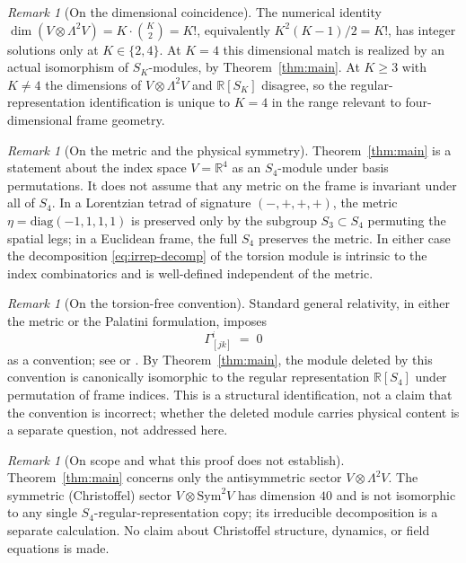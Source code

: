 \documentclass[11pt]{article}
\theoremstyle{plain}
\theoremstyle{remark}
\newtheorem{remark}[theorem]{Remark}
\begin{document}
\begin{remark}[On the dimensional coincidence]
The numerical identity $\dim(V \otimes \Lambda^2 V) = K \cdot \binom{K}{2} = K!$, equivalently $K^2(K-1)/2 = K!$, has integer solutions only at $K \in \{2, 4\}$. At $K = 4$ this dimensional match is realized by an actual isomorphism of $S_K$-modules, by Theorem~\ref{thm:main}. At $K \geq 3$ with $K \neq 4$ the dimensions of $V \otimes \Lambda^2 V$ and $\mathbb{R}[S_K]$ disagree, so the regular-representation identification is unique to $K = 4$ in the range relevant to four-dimensional frame geometry.
\end{remark}

\begin{remark}[On the metric and the physical symmetry]
Theorem~\ref{thm:main} is a statement about the index space $V = \mathbb{R}^4$ as an $S_4$-module under basis permutations. It does not assume that any metric on the frame is invariant under all of $S_4$. In a Lorentzian tetrad of signature $(-,+,+,+)$, the metric $\eta = \mathrm{diag}(-1, 1, 1, 1)$ is preserved only by the subgroup $S_3 \subset S_4$ permuting the spatial legs; in a Euclidean frame, the full $S_4$ preserves the metric. In either case the decomposition \eqref{eq:irrep-decomp} of the torsion module is intrinsic to the index combinatorics and is well-defined independent of the metric.
\end{remark}

\begin{remark}[On the torsion-free convention]
Standard general relativity, in either the metric or the Palatini formulation, imposes
\[
\Gamma^{i}_{[jk]} \;=\; 0
\]
as a convention; see \cite[\S 3.1]{Wald1984} or \cite[Box~10.1]{MTW}. By Theorem~\ref{thm:main}, the module deleted by this convention is canonically isomorphic to the regular representation $\mathbb{R}[S_4]$ under permutation of frame indices. This is a structural identification, not a claim that the convention is incorrect; whether the deleted module carries physical content is a separate question, not addressed here.
\end{remark}

\begin{remark}[On scope and what this proof does not establish]
Theorem~\ref{thm:main} concerns only the antisymmetric sector $V \otimes \Lambda^2 V$. The symmetric (Christoffel) sector $V \otimes \mathrm{Sym}^2 V$ has dimension $40$ and is not isomorphic to any single $S_4$-regular-representation copy; its irreducible decomposition is a separate calculation. No claim about Christoffel structure, dynamics, or field equations is made.
\end{remark}
\end{document}
